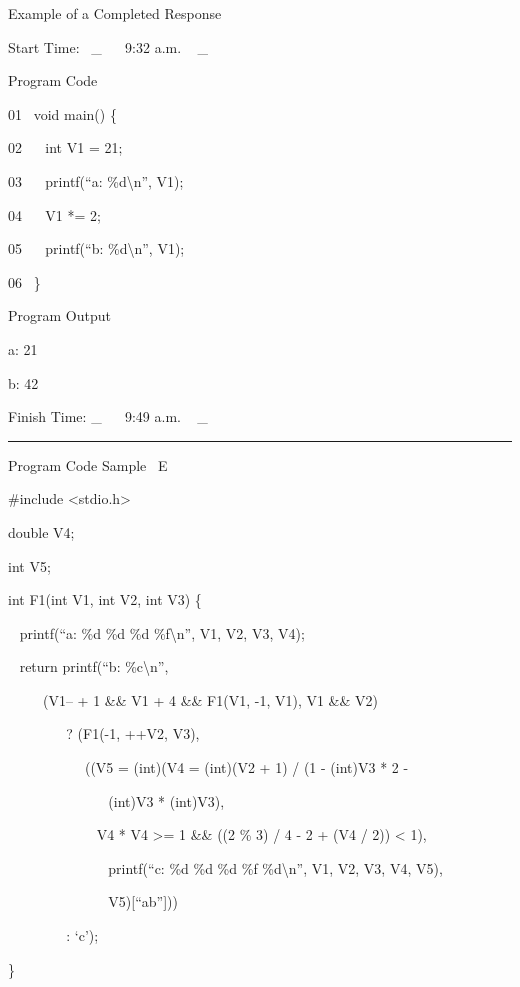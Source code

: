 \documentclass[12pt, a4paper, oneside]{article}
\begin{document}
{Example of a Completed Response}

{Start Time}{: ~}{\_ ~ ~9:32 a.m. ~ \_}{~~~~~~~~~~~~~~~~}

{Program Code}

{01 ~void main() \{}

{02 ~ ~int V1 = 21;}

{03 ~ ~printf(``a: \%d\textbackslash{}n'', V1);}

{04 ~ ~V1 *= 2;}

{05 ~ ~printf(``b: \%d\textbackslash{}n'', V1);}

{06 ~\}}

{Program Output}

{a: 21}

{b: 42}

{Finish Time}{: }{\_ ~ ~9:49 a.m. ~ \_}

\begin{center}\rule{0.5\linewidth}{\linethickness}\end{center}

  \pagebreak


{Program Code Sample ~E}

{}

{\#include \textless{}stdio.h\textgreater{}}

{double V4;}

{int V5;}

{}

{int F1(int V1, int V2, int V3) \{}

{~ printf(``a: \%d \%d \%d \%f\textbackslash{}n'', V1, V2, V3, V4);}

{~ return printf(``b: \%c\textbackslash{}n'',}

{~ ~ ~ (V1-- + 1 \&\& V1 + 4 \&\& F1(V1, -1, V1), V1 \&\& V2)}

{~ ~ ~ ~ ~ ? (F1(-1, ++V2, V3),}

{~ ~ ~ ~ ~ ~ ~((V5 = (int)(V4 = (int)(V2 + 1) / (1 - (int)V3 * 2 -}

{~ ~ ~ ~ ~ ~ ~ ~ ~(int)V3 * (int)V3),}

{~ ~ ~ ~ ~ ~ ~ ~V4 * V4 \textgreater{}= 1 \&\& ((2 \% 3) / 4 - 2 + (V4 /
2)) \textless{} 1),}

{~ ~ ~ ~ ~ ~ ~ ~ ~printf(``c: \%d \%d \%d \%f \%d\textbackslash{}n'',
V1, V2, V3, V4, V5),}

{~ ~ ~ ~ ~ ~ ~ ~ ~V5){[}``ab''{]}))}

{~ ~ ~ ~ ~ : `c');}

{\}}

{}
\end{document}
